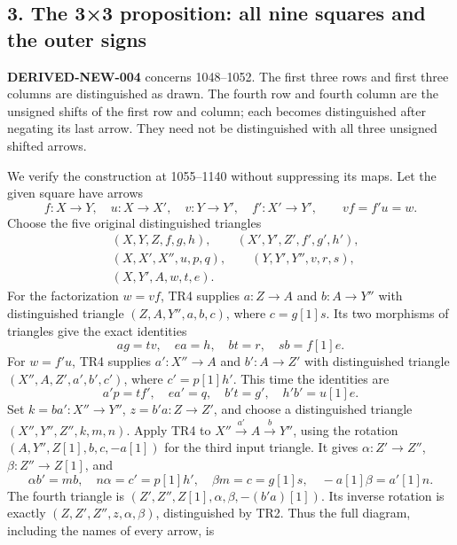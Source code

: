 \documentclass[11pt]{article}
\begin{document}
\subsection{\texorpdfstring{3. The 3×3 proposition:\allowbreak{} all nine squares and the outer signs}{3. The 3×3  all nine squares and the outer signs}}\label{proofs-0001-1140-the-33-proposition-all-nine-squares-and-the-outer-signs}

\textbf{DERIVED-NEW-004} concerns 1048–\allowbreak{}1052. The first three rows and first three columns are distinguished as drawn. The fourth row and fourth column are the unsigned shifts of the first row and column; each becomes distinguished after negating its last arrow. They need not be distinguished with all three unsigned shifted arrows.

We verify the construction at 1055–\allowbreak{}1140 without suppressing its maps. Let the given square have arrows \[
f:X\to Y,\quad u:X\to X',\quad v:Y\to Y',\quad
f':X'\to Y',\qquad vf=f'u=w.
\] Choose the five original distinguished triangles \[
\begin{split}
&(X,Y,Z,f,g,h),\qquad(X',Y',Z',f',g',h'),\\
&(X,X',X'',u,p,q),\qquad(Y,Y',Y'',v,r,s),\\
&(X,Y',A,w,t,e).
\end{split}
\] For the factorization \(w=vf\),\allowbreak{} TR4 supplies \(a:Z\to A\) and \(b:A\to Y''\) with distinguished triangle \((Z,A,Y'',a,b,c)\),\allowbreak{} where \(c=g[1]s\). Its two morphisms of triangles give the exact identities \[
ag=tv,\quad ea=h,\quad bt=r,\quad sb=f[1]e.
\] For \(w=f'u\),\allowbreak{} TR4 supplies \(a':X''\to A\) and \(b':A\to Z'\) with distinguished triangle \((X'',A,Z',a',b',c')\),\allowbreak{} where \(c'=p[1]h'\). This time the identities are \[
a'p=tf',\quad ea'=q,\quad b't=g',\quad h'b'=u[1]e.
\] Set \(k=ba':X''\to Y''\),\allowbreak{} \(z=b'a:Z\to Z'\),\allowbreak{} and choose a distinguished triangle \((X'',Y'',Z'',k,m,n)\). Apply TR4 to \(X''\xrightarrow{a'}A\xrightarrow bY''\),\allowbreak{} using the rotation \((A,Y'',Z[1],b,c,-a[1])\) for the third input triangle. It gives \(\alpha:Z'\to Z''\),\allowbreak{} \(\beta:Z''\to Z[1]\),\allowbreak{} and \[
\alpha b'=mb,\quad n\alpha=c'=p[1]h',\quad
\beta m=c=g[1]s,\quad -a[1]\beta=a'[1]n.
\] The fourth triangle is \((Z',Z'',Z[1],\alpha,\beta,-(b'a)[1])\). Its inverse rotation is exactly \((Z,Z',Z'',z,\alpha,\beta)\),\allowbreak{} distinguished by TR2. Thus the full diagram,\allowbreak{} including the names of every arrow,\allowbreak{} is \[
\begin{array}{ccccccc}

\end{array}\]
\end{document}
